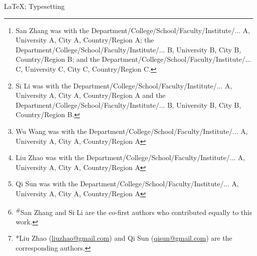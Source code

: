 \documentclass[lettersize,journal]{IEEEtran}
\begin{document}
\title{}

\author{
	San Zhang\textsuperscript{\#}\thanks{San Zhang was with the Department/College/School/Faculty/Institute/... A, University A, City A, Country/Region A; the Department/College/School/Faculty/Institute/... B, University B, City B, Country/Region B; and the Department/College/School/Faculty/Institute/... C, University C, City C, Country/Region C. }, 
	Si Li\textsuperscript{\#}\thanks{Si Li was with the Department/College/School/Faculty/Institute/... A, University A, City A, Country/Region A and the Department/College/School/Faculty/Institute/... B, University B, City B, Country/Region B. }, 
	Wu Wang\thanks{Wu Wang was with the Department/College/School/Faculty/Institute/... A, University A, City A, Country/Region A}, 
	Liu Zhao*\thanks{Liu Zhao was with the Department/College/School/Faculty/Institute/... A, University A, City A, Country/Region A}, 
	and Qi Sun*\thanks{Qi Sun was with the Department/College/School/Faculty/Institute/... A, University A, City A, Country/Region A}
	\thanks{\textsuperscript{\#}San Zhang and Si Li are the co-first authors who contributed equally to this work. }
	\thanks{*Liu Zhao (\protect\url{liuzhao@gmail.com}) and Qi Sun (\protect\url{qisun@gmail.com}) are the corresponding authors. }
}

\maketitle

\begin{abstract}
	\ 
\end{abstract}

\begin{IEEEkeywords}
	LaTeX; Typesetting
\end{IEEEkeywords}










\end{document}
